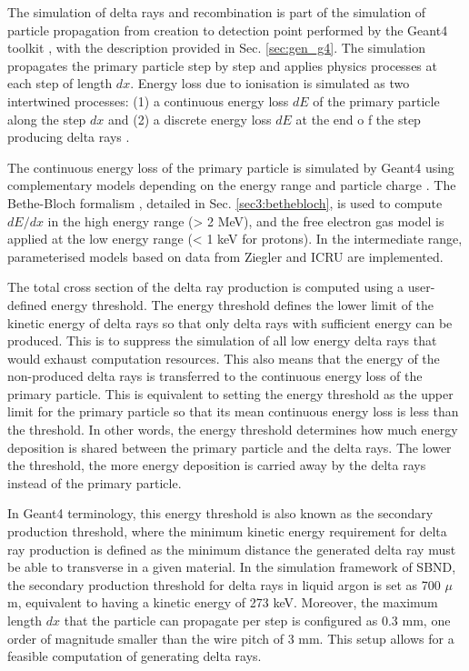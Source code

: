 The simulation of delta rays and recombination is part of the simulation of particle propagation from creation to detection point performed by the Geant4 toolkit \cite{geant4}, with the description provided in Sec. \ref{sec:gen_g4}.
The simulation propagates the primary particle step by step and applies physics processes at each step of length $dx$.
Energy loss due to ionisation is simulated as two intertwined processes: (1) a continuous energy loss $dE$ of the primary particle along the step $dx$ and (2) a discrete energy loss $dE$ at the end o
f the step producing delta rays \cite{geant4}.

The continuous energy loss of the primary particle is simulated by Geant4 using complementary models depending on the energy range and particle charge \cite{geant4_ions}.
The Bethe-Bloch formalism \cite{Passage}, detailed in Sec. \ref{sec3:bethebloch}, is used to compute $dE/dx$ in the high energy range (> 2 MeV), and the free electron gas model is applied at the low 
energy range (< 1 keV for protons).
In the intermediate range, parameterised models based on data from Ziegler \cite{Ziegler} and ICRU \cite{ICRU} are implemented.

The total cross section of the delta ray production is computed using a user-defined energy threshold.
The energy threshold defines the lower limit of the kinetic energy of delta rays so that only delta rays with sufficient energy can be produced.
This is to suppress the simulation of all low energy delta rays that would exhaust computation resources.
This also means that the energy of the non-produced delta rays is transferred to the continuous energy loss of the primary particle.
This is equivalent to setting the energy threshold as the upper limit for the primary particle so that its mean continuous energy loss is less than the threshold.
In other words, the energy threshold determines how much energy deposition is shared between the primary particle and the delta rays. 
The lower the threshold, the more energy deposition is carried away by the delta rays instead of the primary particle. 

In Geant4 terminology, this energy threshold is also known as the secondary production threshold, where the minimum kinetic energy requirement for delta ray production is defined as the minimum distance the generated delta ray must be able to transverse in a given material. 
In the simulation framework of SBND, the secondary production threshold for delta rays in liquid argon is set as 700 $\mu$m, equivalent to having a kinetic energy of 273 keV.
Moreover, the maximum length $dx$ that the particle can propagate per step is configured as 0.3 mm, one order of magnitude smaller than the wire pitch of 3 mm.
This setup allows for a feasible computation of generating delta rays.

